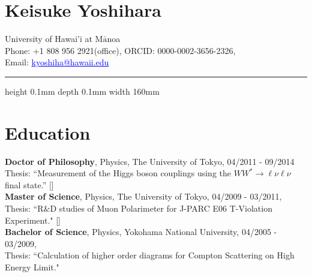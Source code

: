 \documentclass[12pt]{article}
\begin{document}

\section*{\Large{Keisuke Yoshihara}}
{
{\footnotesize
University of Hawai'i at M$\bar{\text{a}}$noa \\
Phone: +1 808 956 2921(office), ORCID: 0000-0002-3656-2326, \\
Email: \textcolor{blue}{\underline{kyoshiha@hawaii.edu}} \\
}
\hrule height 0.1mm depth 0.1mm width 160mm 

\section*{\large{Education}} 
{\footnotesize
\textbf{Doctor of Philosophy}, Physics, The University of Tokyo, 04/2011 - 09/2014 \\
Thesis: ``Measurement of the Higgs boson couplings using the $WW^{\ast}\rightarrow \ell\nu\ell\nu$ final state.'' 
[]\\ 
\textbf{Master of Science}, Physics, The University of Tokyo, 04/2009 - 03/2011,\\
Thesis: ``R$\&$D studies of Muon Polarimeter for J-PARC E06 T-Violation Experiment." 
[]\\
 \textbf{Bachelor of Science}, Physics, Yokohama National University, 04/2005 - 03/2009,\\
Thesis: ``Calculation of higher order diagrams for Compton Scattering on High Energy Limit." \\
}

}
\end{document}
